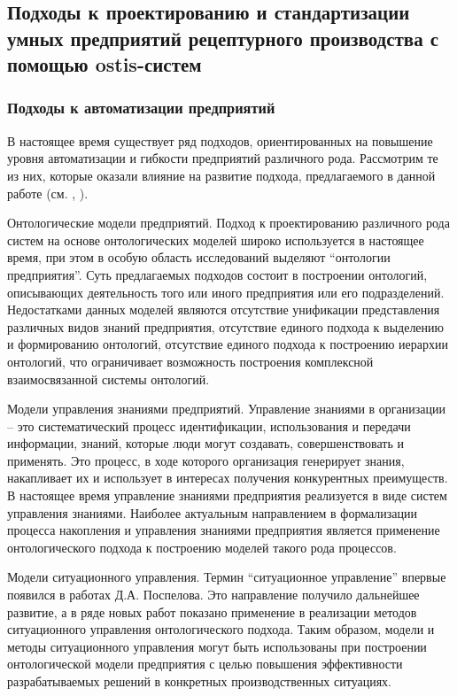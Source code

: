 \subsection{Подходы к проектированию и стандартизации умных предприятий рецептурного производства с помощью ostis-систем}


\subsubsection{Подходы к автоматизации предприятий}

В настоящее время существует ряд подходов, ориентированных на повышение уровня автоматизации и гибкости предприятий различного рода. Рассмотрим те из них, которые оказали влияние на развитие подхода, предлагаемого в данной работе (см. , ).
\begin{textitemize}
    \item Онтологические модели предприятий. Подход к проектированию различного рода систем на основе онтологических моделей широко используется в настоящее время, при этом в особую область исследований выделяют ``онтологии предприятия''. Суть предлагаемых подходов состоит в построении онтологий, описывающих деятельность того или иного предприятия или его подразделений. Недостатками данных моделей являются отсутствие унификации представления различных видов знаний предприятия, отсутствие единого подхода к выделению и формированию онтологий, отсутствие единого подхода к построению иерархии онтологий, что ограничивает возможность построения комплексной взаимосвязанной системы онтологий.
    \item Модели управления знаниями предприятий. Управление знаниями в организации – это систематический процесс идентификации, использования и передачи информации, знаний, которые люди могут создавать, совершенствовать и применять. Это процесс, в ходе которого организация генерирует знания, накапливает их и использует в интересах получения конкурентных преимуществ. В настоящее время управление знаниями предприятия реализуется в виде систем управления знаниями. Наиболее актуальным направлением в формализации процесса накопления и управления знаниями предприятия является применение онтологического подхода к построению моделей такого рода процессов.
    \item Модели ситуационного управления. Термин ``ситуационное управление'' впервые появился в работах Д.А. Поспелова. Это направление получило дальнейшее развитие, а в ряде новых работ показано применение в реализации методов ситуационного управления онтологического подхода. Таким образом, модели и методы ситуационного управления могут быть использованы при построении онтологической модели предприятия с целью повышения эффективности разрабатываемых решений в конкретных производственных ситуациях.

\end{textitemize}

